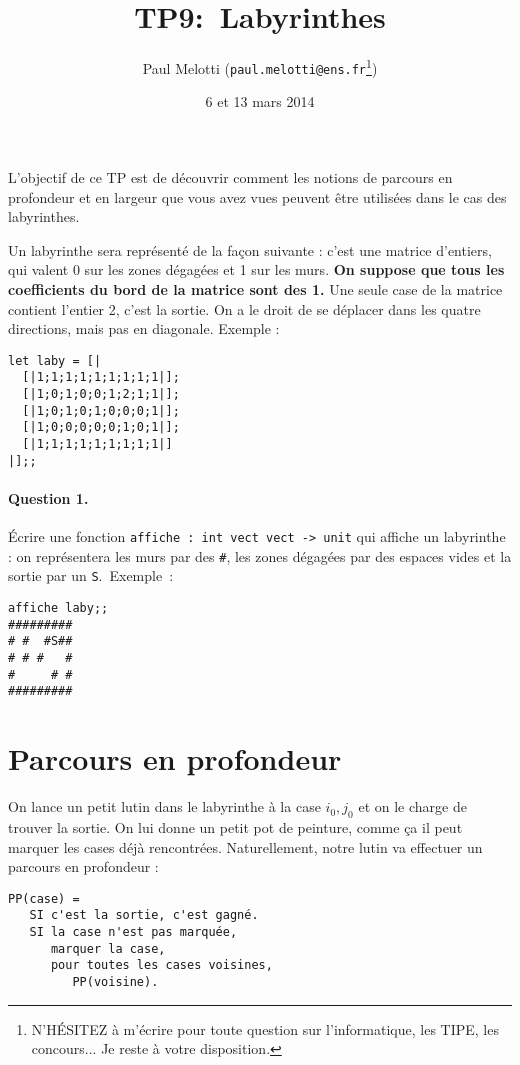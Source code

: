 \documentclass[10pt,a4paper]{article}
\begin{document}
\title{TP9: Labyrinthes}
\author{Paul Melotti (\texttt{paul.melotti@ens.fr}\footnote{N'HÉSITEZ à 
m'écrire pour toute question sur l'informatique, les TIPE, les concours... Je 
reste à votre disposition.})}
\date{6 et 13 mars 2014}
\maketitle{}

L'objectif de ce TP est de découvrir comment les notions de parcours en 
profondeur et en largeur que vous avez vues peuvent être utilisées dans le cas
des labyrinthes.

Un labyrinthe sera représenté de la façon suivante : c'est une matrice d'entiers,
qui valent 0 sur les zones dégagées et 1 sur les murs. \textbf{On suppose que tous
les coefficients du bord de la matrice sont des 1.} Une seule case de la matrice
contient l'entier 2, c'est la sortie. On a le droit de se déplacer dans les quatre
directions, mais pas en diagonale. Exemple :
\begin{verbatim}let laby = [|
  [|1;1;1;1;1;1;1;1;1|];
  [|1;0;1;0;0;1;2;1;1|];
  [|1;0;1;0;1;0;0;0;1|];
  [|1;0;0;0;0;0;1;0;1|];
  [|1;1;1;1;1;1;1;1;1|]
|];;\end{verbatim}
 
\paragraph{Question 1.} Écrire une fonction \texttt{affiche : int vect vect -> unit}
qui affiche un labyrinthe : on représentera les murs par des \texttt{\#}, les 
zones dégagées par des espaces vides et la sortie par un \texttt{S}. Exemple :
\begin{verbatim}affiche laby;;
#########
# #  #S##
# # #   #
#     # #
#########\end{verbatim}

\section{Parcours en profondeur}
On lance un petit lutin dans le labyrinthe à la case $i_0,j_0$ et on le charge
de trouver la sortie. On lui donne un petit pot de peinture, comme ça il peut 
marquer les cases déjà rencontrées. Naturellement, notre lutin va effectuer un
parcours en profondeur :
\begin{verbatim}PP(case) =
   SI c'est la sortie, c'est gagné.
   SI la case n'est pas marquée,
      marquer la case,
      pour toutes les cases voisines,
         PP(voisine).
\end{verbatim}
\end{document}
